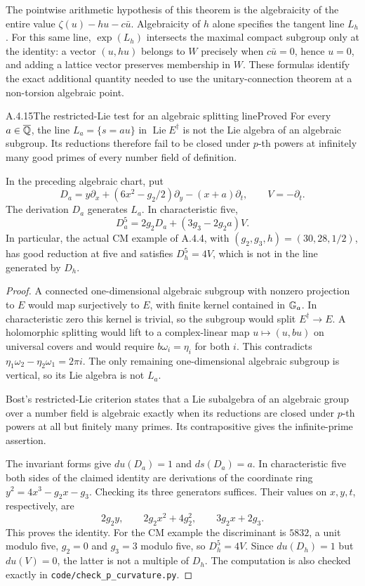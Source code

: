 The pointwise arithmetic hypothesis of this theorem is the algebraicity of the entire value $\zeta(u)-hu-c\bar u$. Algebraicity of $h$ alone specifies the tangent line $L_h$. For this same line, $\exp(L_h)$ intersects the maximal compact subgroup only at the identity: a vector $(u,hu)$ belongs to $W$ precisely when $c\bar u=0$, hence $u=0$, and adding a lattice vector preserves membership in $W$. These formulas identify the exact additional quantity needed to use the unitary-connection theorem at a non-torsion algebraic point.

\begin{result}{A.4.15}{The restricted-Lie test for an algebraic splitting line}{Proved}
For every $a\in\overline{\mathbb Q}$, the line $L_a=\{s=au\}$ in $\operatorname{Lie}E^\dagger$ is not the Lie algebra of an algebraic subgroup. Its reductions therefore fail to be closed under $p$-th powers at infinitely many good primes of every number field of definition.

In the preceding algebraic chart, put
\[
 D_a=y\partial_x+(6x^2-g_2/2)\partial_y-(x+a)\partial_t,
 \qquad V=-\partial_t.
\]
The derivation $D_a$ generates $L_a$. In characteristic five,
\[
 D_a^5=2g_2D_a+(3g_3-2g_2a)V.
\]
In particular, the actual CM example of A.4.4, with $(g_2,g_3,h)=(30,28,1/2)$, has good reduction at five and satisfies $D_h^5=4V$, which is not in the line generated by $D_h$.
\end{result}
\begin{proof}
A connected one-dimensional algebraic subgroup with nonzero projection to $E$ would map surjectively to $E$, with finite kernel contained in $\mathbb G_a$. In characteristic zero this kernel is trivial, so the subgroup would split $E^\dagger\to E$. A holomorphic splitting would lift to a complex-linear map $u\mapsto(u,bu)$ on universal covers and would require $b\omega_i=\eta_i$ for both $i$. This contradicts $\eta_1\omega_2-\eta_2\omega_1=2\pi i$. The only remaining one-dimensional algebraic subgroup is vertical, so its Lie algebra is not $L_a$.

Bost's restricted-Lie criterion \cite[Theorem 2.3, p.172]{EllBost2001} states that a Lie subalgebra of an algebraic group over a number field is algebraic exactly when its reductions are closed under $p$-th powers at all but finitely many primes. Its contrapositive gives the infinite-prime assertion.

The invariant forms give $du(D_a)=1$ and $ds(D_a)=a$. In characteristic five both sides of the claimed identity are derivations of the coordinate ring $y^2=4x^3-g_2x-g_3$. Checking its three generators suffices. Their values on $x,y,t$, respectively, are
\[
 2g_2y,\qquad 2g_2x^2+4g_2^2,\qquad 3g_2x+2g_3.
\]
This proves the identity. For the CM example the discriminant is $5832$, a unit modulo five, $g_2=0$ and $g_3=3$ modulo five, so $D_h^5=4V$. Since $du(D_h)=1$ but $du(V)=0$, the latter is not a multiple of $D_h$. The computation is also checked exactly in \texttt{code/check\_p\_curvature.py}.
\end{proof}

